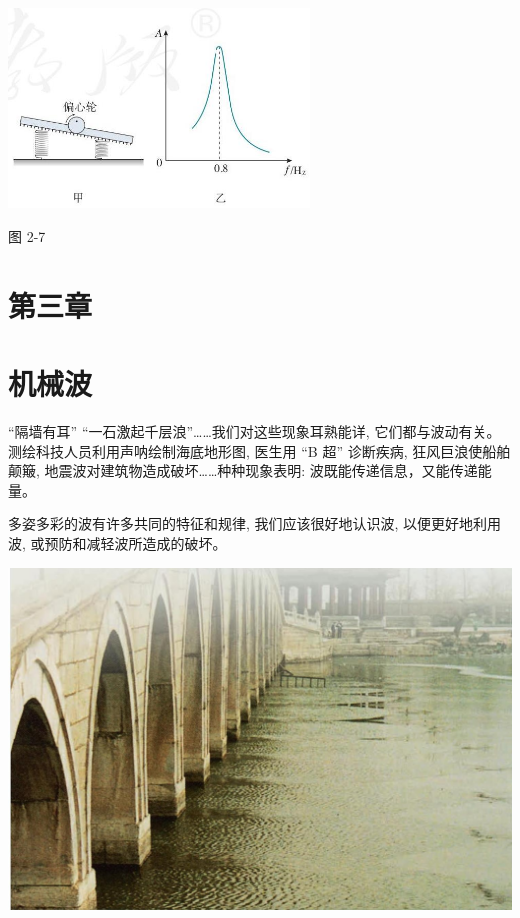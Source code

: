\documentclass[10pt]{article}
\begin{document}
\begin{center}
\includegraphics[max width=0.6\textwidth]{images/01910e4c-ebb8-7d2c-8f2f-2375bc1d2d12_65_301811.jpg}
\end{center}

图 2-7

\section*{第三章}

\section*{机械波}

“隔墙有耳” “一石激起千层浪”……我们对这些现象耳熟能详, 它们都与波动有关。测绘科技人员利用声呐绘制海底地形图, 医生用 “B 超” 诊断疾病, 狂风巨浪使船舶颠簸, 地震波对建筑物造成破坏……种种现象表明: 波既能传递信息，又能传递能量。

多姿多彩的波有许多共同的特征和规律, 我们应该很好地认识波, 以便更好地利用波, 或预防和减轻波所造成的破坏。

\begin{center}
\includegraphics[max width=1.0\textwidth]{images/01910e4c-ebb8-7d2c-8f2f-2375bc1d2d12_66_302224.jpg}
\end{center}
\end{document}
